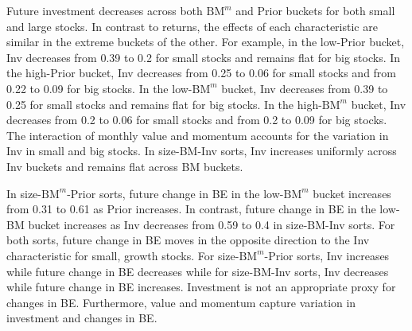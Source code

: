 Future investment decreases across both $\text{BM}^m$ and Prior buckets for
both small and large stocks. In contrast to returns, the effects of each
characteristic are similar in the extreme buckets of the other. For example, in
the low-Prior bucket, Inv decreases from 0.39 to 0.2 for small stocks and
remains flat for big stocks. In the high-Prior bucket, Inv decreases from 0.25
to 0.06 for small stocks and from 0.22 to 0.09 for big stocks. In the
low-$\text{BM}^m$ bucket, Inv decreases from 0.39 to 0.25 for small stocks and
remains flat for big stocks. In the high-$\text{BM}^m$ bucket, Inv decreases
from 0.2 to 0.06 for small stocks and from 0.2 to 0.09 for big stocks. The
interaction of monthly value and momentum accounts for the variation in Inv in
small and big stocks. In size-BM-Inv sorts, Inv increases uniformly across Inv
buckets and remains flat across BM buckets.

In size-$\text{BM}^m$-Prior sorts, future change in BE in the low-$\text{BM}^m$
bucket increases from 0.31 to 0.61 as Prior increases.
In contrast, future change in BE in the low-BM bucket increases as Inv
decreases from 0.59 to 0.4 in size-BM-Inv sorts.
For both sorts, future change in BE moves in the opposite direction to the
Inv characteristic for small, growth stocks.
For size-$\text{BM}^m$-Prior sorts, Inv increases while future change in BE
decreases while for size-BM-Inv sorts, Inv decreases while future change in
BE increases.
Investment is not an appropriate proxy for changes in BE.
Furthermore, value and momentum capture variation in investment and changes in BE.

